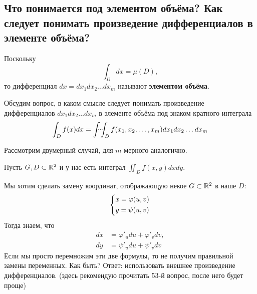 
\subsection{Что понимается под элементом объёма? Как следует понимать произведение дифференциалов в элементе объёма?}

Поскольку 
\begin{equation*}
    \int_D dx = \mu(D),
\end{equation*}
то дифференциал $dx = dx_1 dx_2 \dots dx_m$ называют \textbf{элементом объёма}.

Обсудим вопрос, в каком смысле следует понимать произведение дифференциалов $dx_1 dx_2 \dots dx_m$ в элементе объёма под знаком кратного интеграла 
\begin{equation*}
    \int_D f(x) dx = \idotsint_D f(x_1, x_2,\dots, x_m) dx_1 dx_2 \dots dx_m
\end{equation*}

Рассмотрим двумерный случай, для $m$-мерного аналогично.

Пусть $G, D \subset \mathbb{R}^2$ и у нас есть интеграл $\iint_D f(x, y) dx dy$.

Мы хотим сделать замену координат, отображающую некое $G \subset \mathbb{R}^2$ в наше $D$: 
\begin{equation*}
    \begin{dcases}
        x = \varphi(u, v)\\
        y = \psi(u, v)
    \end{dcases}
\end{equation*}
Тогда знаем, что
\begin{align*}
    dx &= \varphi'_u du + \varphi'_v dv,\\
    dy &= \psi'_u du + \psi'_v dv
\end{align*}
Если мы просто перемножим эти две формулы, то не получим правильной замены переменных. Как быть? Ответ: использовать внешнее произведение дифференциалов. (здесь рекомендую прочитать 53-й вопрос, после него будет проще)

